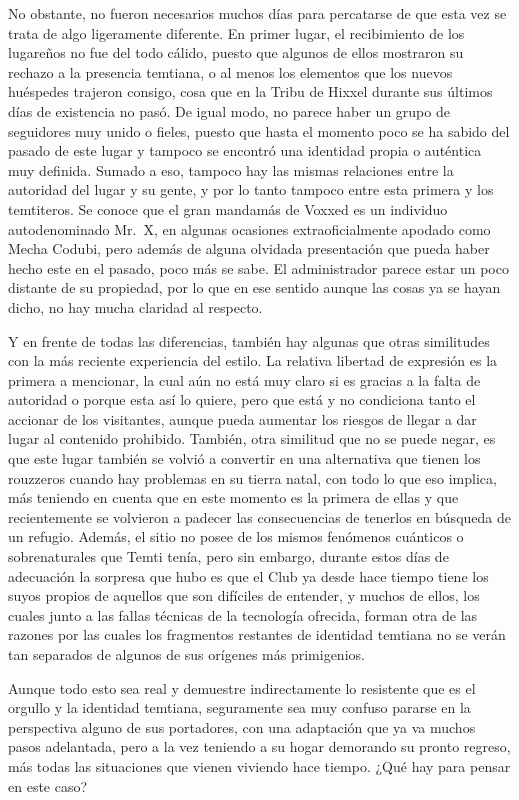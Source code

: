 \documentclass[
  spanish,
]{book}
\begin{document}
No obstante, no fueron necesarios muchos días para percatarse de que esta vez se trata de algo ligeramente diferente. En primer lugar, el recibimiento de los lugareños no fue del todo cálido, puesto que algunos de ellos mostraron su rechazo a la presencia temtiana, o al menos los elementos que los nuevos huéspedes trajeron consigo, cosa que en la Tribu de Hixxel durante sus últimos días de existencia no pasó. De igual modo, no parece haber un grupo de seguidores muy unido o fieles, puesto que hasta el momento poco se ha sabido del pasado de este lugar y tampoco se encontró una identidad propia o auténtica muy definida. Sumado a eso, tampoco hay las mismas relaciones entre la autoridad del lugar y su gente, y por lo tanto tampoco entre esta primera y los temtiteros. Se conoce que el gran mandamás de Voxxed es un individuo autodenominado Mr.~X, en algunas ocasiones extraoficialmente apodado como Mecha Codubi, pero además de alguna olvidada presentación que pueda haber hecho este en el pasado, poco más se sabe. El administrador parece estar un poco distante de su propiedad, por lo que en ese sentido aunque las cosas ya se hayan dicho, no hay mucha claridad al respecto.

Y en frente de todas las diferencias, también hay algunas que otras similitudes con la más reciente experiencia del estilo. La relativa libertad de expresión es la primera a mencionar, la cual aún no está muy claro si es gracias a la falta de autoridad o porque esta así lo quiere, pero que está y no condiciona tanto el accionar de los visitantes, aunque pueda aumentar los riesgos de llegar a dar lugar al contenido prohibido. También, otra similitud que no se puede negar, es que este lugar también se volvió a convertir en una alternativa que tienen los rouzzeros cuando hay problemas en su tierra natal, con todo lo que eso implica, más teniendo en cuenta que en este momento es la primera de ellas y que recientemente se volvieron a padecer las consecuencias de tenerlos en búsqueda de un refugio. Además, el sitio no posee de los mismos fenómenos cuánticos o sobrenaturales que Temti tenía, pero sin embargo, durante estos días de adecuación la sorpresa que hubo es que el Club ya desde hace tiempo tiene los suyos propios de aquellos que son difíciles de entender, y muchos de ellos, los cuales junto a las fallas técnicas de la tecnología ofrecida, forman otra de las razones por las cuales los fragmentos restantes de identidad temtiana no se verán tan separados de algunos de sus orígenes más primigenios.

Aunque todo esto sea real y demuestre indirectamente lo resistente que es el orgullo y la identidad temtiana, seguramente sea muy confuso pararse en la perspectiva alguno de sus portadores, con una adaptación que ya va muchos pasos adelantada, pero a la vez teniendo a su hogar demorando su pronto regreso, más todas las situaciones que vienen viviendo hace tiempo. ¿Qué hay para pensar en este caso?
\end{document}
